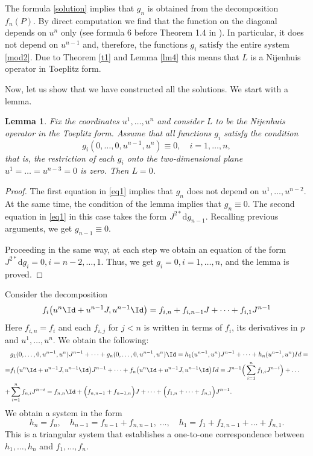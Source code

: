 \documentclass[12pt]{article}
\newtheorem{Lemma}{Lemma}[section]
\theoremstyle{remark}
\newcommand{\ddd}{\mathrm{d}}
\begin{document}
The formula \eqref{solution} implies that $g_n$ is obtained from the decomposition $f_n(P)$. By direct computation we find that the function on the diagonal depends on $u^n$ only (see formula 6 before Theorem 1.4 in \cite{nij4}). In particular, it does not depend on $u^{n - 1}$ and, therefore, the functions $g_i$ satisfy the entire system \eqref{mod2}. Due to Theorem \ref{t1} and Lemma \ref{lm4} this means that $L$ is a Nijenhuis operator in Toeplitz form.

Now, let us show that we have constructed all the solutions. We start with a lemma.

\begin{Lemma}\label{lm5}
Fix the coordinates $u^1, \dots, u^n$ and consider $L$ to be the Nijenhuis operator in the Toeplitz form. Assume that all functions $g_i$ satisfy the condition
$$
g_i (0, \dots, 0, u^{n - 1}, u^n) \equiv 0, \quad i = 1, \dots, n,
$$
that is, the restriction of each $g_i$ onto the two-dimensional plane $u^1 = \dots = u^{n - 3} = 0$ is zero. Then $L = 0$.
\end{Lemma}
\begin{proof}
The first equation in \eqref{eq1} implies that $g_n$ does not depend on $u^1, \dots, u^{n - 2}$. At the same time, the condition of the lemma implies that $g_n \equiv 0$. The second equation in \eqref{eq1} in this case takes the form $J^{2*} \ddd g_{n - 1}$. Recalling previous arguments, we get $g_{n - 1} \equiv 0$. 

Proceeding in the same way, at each step we obtain an equation of the form $J^{2*} \ddd g_i = 0, i = n - 2, \dots, 1$. Thus, we get $g_i = 0, i = 1, \dots, n$, and the lemma is proved.
\end{proof}

Consider the decomposition
\begin{equation*}
f_i \big(u^n \Id + u^{n - 1} J, u^{n - 1} \Id\big) = f_{i, n} + f_{i, n - 1} J + \dots + f_{i, 1} J^{n - 1}
\end{equation*}
Here $f_{i, n} = f_i$ and each $f_{i, j}$ for $j < n$ is written in terms of $f_i$, its derivatives in $p$ and $u^1, \dots, u^n$. We obtain the following:
$$
\begin{aligned}
& g_1(0, \dots, 0, u^{n - 1}, u^n) J^{n - 1} + \dots + g_n(0, \dots, 0, u^{n - 1}, u^n) \Id = h_1(u^{n - 1}, u^n) J^{n - 1} + \dots + h_n(u^{n - 1}, u^n)Id = \\
= & f_1 \big(u^n \Id + u^{n - 1} J, u^{n - 1} \Id\big) J^{n - 1} + \dots + f_n \big(u^n \Id + u^{n - 1} J, u^{n - 1} \Id\big)Id = J^{n - 1} \Big(\sum_{i = 1}^n f_{1, i} J^{n - i}\Big) + \dots \\
+ & \sum_{i = 1}^n f_{n, i} J^{n - i} = f_{n, n} \Id + \Big( f_{n, n - 1} + f_{n - 1, n}\Big) J + \dots + \Big( f_{1, n} + \dots + f_{n, 1}\Big) J^{n - 1}.
\end{aligned}
$$
We obtain a system in the form
\begin{equation}\label{stt}
h_n = f_n, \quad h_{n - 1} = f_{n - 1} + f_{n, n - 1}, \; \ldots, \quad h_1 = f_1 + f_{2, n - 1} +\dots + f_{n, 1}.    
\end{equation}
This is a triangular system that establishes a one-to-one correspondence between $h_1, \dots, h_n$ and $f_1, \dots, f_n$.
\end{document}

